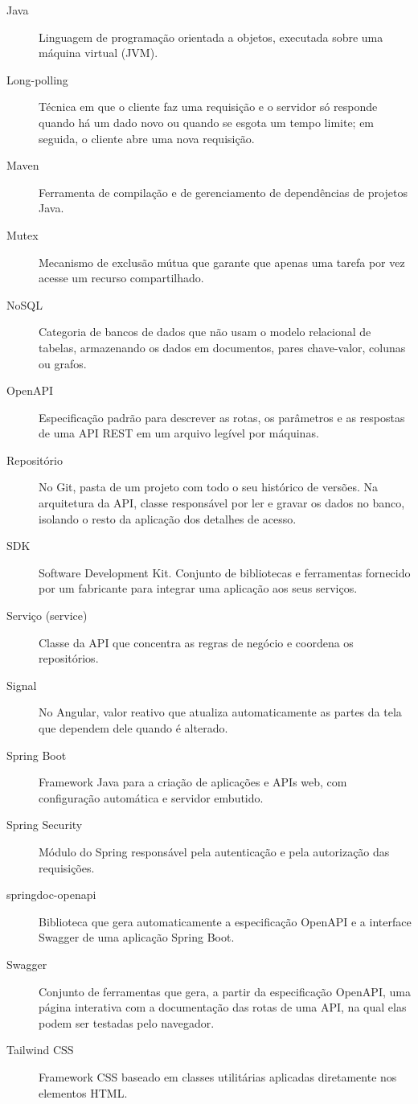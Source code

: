 \begin{description}
  \item[Java] Linguagem de programação orientada a objetos, executada sobre uma máquina virtual (JVM).
  \item[Long-polling] Técnica em que o cliente faz uma requisição e o servidor só responde quando há um dado novo ou quando se esgota um tempo limite; em seguida, o cliente abre uma nova requisição.
  \item[Maven] Ferramenta de compilação e de gerenciamento de dependências de projetos Java.
  \item[Mutex] Mecanismo de exclusão mútua que garante que apenas uma tarefa por vez acesse um recurso compartilhado.
  \item[NoSQL] Categoria de bancos de dados que não usam o modelo relacional de tabelas, armazenando os dados em documentos, pares chave-valor, colunas ou grafos.
  \item[OpenAPI] Especificação padrão para descrever as rotas, os parâmetros e as respostas de uma API REST em um arquivo legível por máquinas.
  \item[Repositório] No Git, pasta de um projeto com todo o seu histórico de versões. Na arquitetura da API, classe responsável por ler e gravar os dados no banco, isolando o resto da aplicação dos detalhes de acesso.
  \item[SDK] Software Development Kit. Conjunto de bibliotecas e ferramentas fornecido por um fabricante para integrar uma aplicação aos seus serviços.
  \item[Serviço (service)] Classe da API que concentra as regras de negócio e coordena os repositórios.
  \item[Signal] No Angular, valor reativo que atualiza automaticamente as partes da tela que dependem dele quando é alterado.
  \item[Spring Boot] Framework Java para a criação de aplicações e APIs web, com configuração automática e servidor embutido.
  \item[Spring Security] Módulo do Spring responsável pela autenticação e pela autorização das requisições.
  \item[springdoc-openapi] Biblioteca que gera automaticamente a especificação OpenAPI e a interface Swagger de uma aplicação Spring Boot.
  \item[Swagger] Conjunto de ferramentas que gera, a partir da especificação OpenAPI, uma página interativa com a documentação das rotas de uma API, na qual elas podem ser testadas pelo navegador.
  \item[Tailwind CSS] Framework CSS baseado em classes utilitárias aplicadas diretamente nos elementos HTML.

\end{description}
